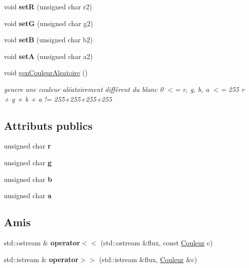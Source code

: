 \begin{DoxyCompactItemize}
void {\bfseries setR} (unsigned char r2)
\item 
\mbox{\label{class_couleur_adabf45ced704d7e502d1316117f70962}} 
void {\bfseries setG} (unsigned char g2)
\item 
\mbox{\label{class_couleur_abdf019ce77e395b486401b1e15429b9c}} 
void {\bfseries setB} (unsigned char b2)
\item 
\mbox{\label{class_couleur_acd8000be85a0905da28a0dea340cb921}} 
void {\bfseries setA} (unsigned char a2)
\item 
\mbox{\label{class_couleur_ae2276ae384ff8f67ee7046a2c6002350}} 
void \mbox{\hyperlink{class_couleur_ae2276ae384ff8f67ee7046a2c6002350}{gen\+Couleur\+Aleatoire}} ()
\begin{DoxyCompactList}\small\item\em genere une couleur aléatoirement différent du blanc 0 $<$= r, g, b, a $<$= 255 r + g + b + a != 255+255+255+255 \end{DoxyCompactList}\end{DoxyCompactItemize}
\subsection*{Attributs publics}
\begin{DoxyCompactItemize}
\item 
\mbox{\label{class_couleur_ad214a4530958733809ae758a45676591}} 
unsigned char {\bfseries r}
\item 
\mbox{\label{class_couleur_a5829744f15fa3305a33e2619ac917680}} 
unsigned char {\bfseries g}
\item 
\mbox{\label{class_couleur_a96029ad2fdaef1aeddb7f2f99399e072}} 
unsigned char {\bfseries b}
\item 
\mbox{\label{class_couleur_a222826b7464029f3be47433333330a7e}} 
unsigned char {\bfseries a}
\end{DoxyCompactItemize}
\subsection*{Amis}
\begin{DoxyCompactItemize}
\item 
\mbox{\label{class_couleur_a07f76e63d49b7d0950c0a1935feb2d27}} 
std\+::ostream \& {\bfseries operator$<$$<$} (std\+::ostream \&flux, const \mbox{\hyperlink{class_couleur}{Couleur}} c)
\item 
\mbox{\label{class_couleur_a06cd1aee21f5fc1ee8cb3c6aaff76615}} 
std\+::istream \& {\bfseries operator$>$$>$} (std\+::istream \&flux, \mbox{\hyperlink{class_couleur}{Couleur}} \&c)
\end{DoxyCompactItemize}


